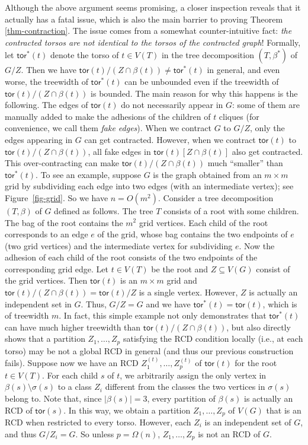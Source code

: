 \documentclass[a4paper,11pt]{article}
\numberwithin{lemma}{section}
\newcommand{\tor}{\mathsf{tor}}
\begin{document}
Although the above argument seems promising, a closer inspection reveals that it actually has a fatal issue, which is also the main barrier to proving Theorem \ref{thm-contraction}.
The issue comes from a somewhat counter-intuitive fact: \emph{the contracted torsos are not identical to the torsos of the contracted graph}!
Formally, let $\tor^*(t)$ denote the torso of $t \in V(T)$ in the tree decomposition $(T,\beta^*)$ of $G/Z$.
Then we have $\tor(t)/(Z \cap \beta(t)) \neq \tor^*(t)$ in general, and even worse, the treewidth of $\tor^*(t)$ can be unbounded even if the treewidth of $\tor(t)/(Z \cap \beta(t))$ is bounded.
The main reason for why this happens is the following.
The edges of $\tor(t)$ do not necessarily appear in $G$: some of them are manually added to make the adhesions of the children of $t$ cliques (for convenience, we call them \emph{fake edges}).
When we contract $G$ to $G/Z$, only the edges appearing in $G$ can get contracted.
However, when we contract $\tor(t)$ to $\tor(t)/(Z \cap \beta(t))$, all fake edges in $\tor(t)[Z \cap \beta(t)]$ also get contracted.
This over-contracting can make $\tor(t)/(Z \cap \beta(t))$ much ``smaller'' than $\tor^*(t)$.
To see an example, suppose $G$ is the graph obtained from an $m \times m$ grid by subdividing each edge into two edges (with an intermediate vertex); see Figure~\ref{fig-grid}.
So we have $n = O(m^2)$.
Consider a tree decomposition $(T,\beta)$ of $G$ defined as follows.
The tree $T$ consists of a root with some children.
The bag of the root contains the $m^2$ grid vertices.
Each child of the root corresponds to an edge $e$ of the grid, whose bag contains the two endpoints of $e$ (two grid vertices) and the intermediate vertex for subdividing $e$.
Now the adhesion of each child of the root consists of the two endpoints of the corresponding grid edge.
Let $t \in V(T)$ be the root and $Z \subseteq V(G)$ consist of the grid vertices.
Then $\tor(t)$ is an $m \times m$ grid and $\tor(t)/(Z \cap \beta(t)) = \tor(t)/Z$ is a single vertex.
However, $Z$ is actually an independent set in $G$.
Thus, $G/Z = G$ and we have $\tor^*(t) = \tor(t)$, which is of treewidth $m$.
In fact, this simple example not only demonstrates that $\tor^*(t)$ can have much higher treewidth than $\tor(t)/(Z \cap \beta(t))$, but also directly shows that a partition $Z_1,\dots,Z_p$ satisfying the RCD condition locally (i.e., at each torso) may be not a global RCD in general (and thus our previous construction fails).
Suppose now we have an RCD $Z_1^{(t)},\dots,Z_p^{(t)}$ of $\tor(t)$ for the root $t \in V(T)$.
For each child $s$ of $t$, we arbitrarily assign the only vertex in $\beta(s) \setminus \sigma(s)$ to a class $Z_i$ different from the classes the two vertices in $\sigma(s)$ belong to.
Note that, since $|\beta(s)| = 3$, every partition of $\beta(s)$ is actually an RCD of $\tor(s)$.
In this way, we obtain a partition $Z_1,\dots,Z_p$ of $V(G)$ that is an RCD when restricted to every torso.
However, each $Z_i$ is an independent set of $G$, and thus $G/Z_i = G$.
So unless $p = \Omega(n)$, $Z_1,\dots,Z_p$ is not an RCD of $G$.
\end{document}
